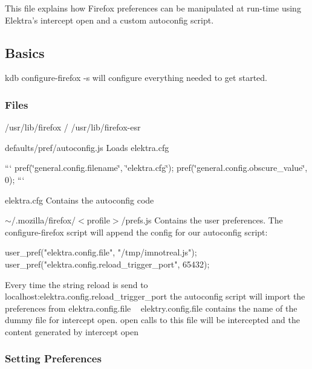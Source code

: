 This file explains how Firefox preferences can be manipulated at run-\/time using Elektra’s intercept open and a custom autoconfig script.

\subsection*{Basics}

{\ttfamily kdb configure-\/firefox -\/s} will configure everything needed to get started.

\subsubsection*{Files}


\begin{DoxyItemize}
\item {\ttfamily /usr/lib/firefox} / {\ttfamily /usr/lib/firefox-\/esr}
\begin{DoxyItemize}
\item {\ttfamily defaults/pref/autoconfig.\+js} Loads {\ttfamily elektra.\+cfg}

``` pref(\char`\"{}general.\+config.\+filename\char`\"{}, \char`\"{}elektra.\+cfg\char`\"{}); pref(\char`\"{}general.\+config.\+obscure\+\_\+value\char`\"{}, 0); ```
\item {\ttfamily elektra.\+cfg} Contains the autoconfig code
\end{DoxyItemize}
\item {\ttfamily $\sim$/.mozilla/firefox/$<$profile$>$/prefs.js} Contains the user preferences. The configure-\/firefox script will append the config for our autoconfig script\+:
\end{DoxyItemize}


\begin{DoxyCode}
user\_pref("elektra.config.file", "/tmp/imnotreal.js");
user\_pref("elektra.config.reload\_trigger\_port", 65432);
\end{DoxyCode}


Every time the string {\ttfamily reload} is send to localhost\+:{\ttfamily elektra.\+config.\+reload\+\_\+trigger\+\_\+port} the autoconfig script will import the preferences from {\ttfamily elektra.\+config.\+file} ~\newline
 {\ttfamily elektry.\+config.\+file} contains the name of the dummy file for {\ttfamily intercept open}. {\ttfamily open} calls to this file will be intercepted and the content generated by {\ttfamily intercept open}

\subsubsection*{Setting Preferences}

